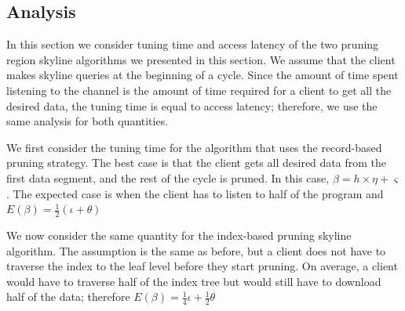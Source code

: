 

\subsection{Analysis}

In this section we consider tuning time and access latency of the
two pruning region skyline algorithms we presented in this
section. We assume that the client makes skyline queries at the
beginning of a cycle. Since the amount of time spent listening to
the channel is the amount of time required for a client to get all
the desired data, the tuning time is equal to access latency;
therefore, we use the same analysis for both quantities.

We first consider the tuning time for the algorithm that uses the
record-based pruning strategy. The best case is that the client
gets all desired data from the first data segment, and the rest of
the cycle is pruned. In this case, $\beta = h \times \eta +
\varsigma$. The expected case is when the client has to listen to
half of the program and $E(\beta) = \frac{1}{2}(\iota + \theta)$

We now consider the same quantity for the index-based pruning
skyline algorithm. The assumption is the same as before, but a
client does not have to traverse the index to the leaf level
before they start pruning. On average, a client would have to
traverse half of the index tree but would still have to download
half of the data; therefore $E(\beta) = \frac{1}{4}\iota +
\frac{1}{2}\theta$

